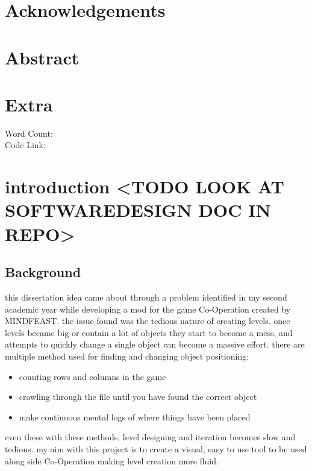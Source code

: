
\section*{Acknowledgements}

\section*{Abstract}

\section*{Extra}
Word Count:\\
Code Link:


\clearpage
{}
\tableofcontents
\clearpage
{}
\listoffigures
\clearpage


\section{introduction <TODO LOOK AT SOFTWAREDESIGN DOC IN REPO>}
\subsection{Background}
this dissertation idea came about through a problem identified in my second academic year while developing a mod for the game Co-Operation created by MINDFEAST. the issue found was the tedious nature of creating levels. once levels became big or contain a lot of objects they start to become a mess, and attempts to quickly change a single object can become a massive effort. there are multiple method used for finding and changing object positioning:
\begin{itemize}
    \item counting rows and columns in the game 
    \item crawling through the file until you have found the correct object
    \item make continuous mental logs of where things have been placed 
\end{itemize}
even these with these methods, level designing and iteration becomes slow and tedious. my aim with this project is to create a visual, easy to use tool to be used along side Co-Operation making level creation more fluid. 

